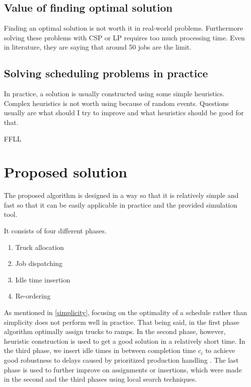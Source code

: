 \documentclass{ctuthesis}
\begin{document}
\section{Value of finding optimal solution}
Finding an optimal solution is not worth it in real-world problems. Furthermore solving these problems with CSP or LP requires too much processing time. Even in literature, they are saying that around 50 jobs are the limit. 
\section{Solving scheduling problems in practice}
In practice, a solution is usually constructed using some simple heuristics. Complex heuristics is not worth using because of random events. Questions usually are what should I try to improve and what heuristics should be good for that. 

FFLL 


\chapter{Proposed solution}
\label{ch:Proposed solution}

The proposed algorithm is designed in a way so that it is relatively simple and fast so that it can be easily applicable in practice and the provided simulation tool.

It consists of four different phases.

\begin{enumerate}
    \item Truck allocation
    \item Job dispatching
    \item Idle time insertion
    \item Re-ordering
\end{enumerate}

As mentioned in \ref{simplicity}, focusing on the optimality of a schedule rather than simplicity does not perform well in practice. That being said, in the first phase algorithm optimally assign trucks to ramps. In the second phase, however, heuristic construction is used to get a good solution in a relatively short time. In the third phase, we insert idle times in between completion time $c_i$ to achieve good robustness to delays caused by prioritized production handling \cite{pinedo}. The last phase is used to further improve on assignments or insertions, which were made in the second and the third phases using local search techniques.
\end{document}
